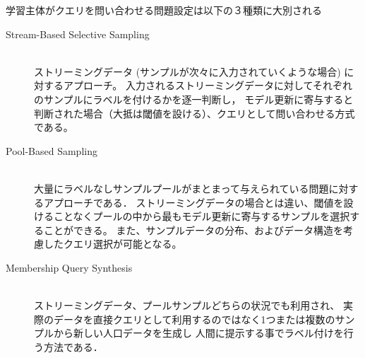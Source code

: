 学習主体がクエリを問い合わせる問題設定は以下の３種類に大別される
\begin{description}
    \item[Stream-Based Selective Sampling]\mbox{}\\
        ストリーミングデータ (サンプルが次々に入力されていくような場合) に対するアプローチ。
        入力されるストリーミングデータに対してそれぞれのサンプルにラベルを付けるかを逐一判断し，
        モデル更新に寄与すると判断された場合（大抵は閾値を設ける）、クエリとして問い合わせる方式である。
    \item[Pool-Based Sampling]\mbox{}\\
        大量にラベルなしサンプルプールがまとまって与えられている問題に対するアプローチである．
        ストリーミングデータの場合とは違い、閾値を設けることなくプールの中から最もモデル更新に寄与するサンプルを選択することができる。
        また、サンプルデータの分布、およびデータ構造を考慮したクエリ選択が可能となる。
    \item[Membership Query Synthesis]\mbox{}\\ 
        ストリーミングデータ、プールサンプルどちらの状況でも利用され、
        実際のデータを直接クエリとして利用するのではなく1つまたは複数のサンプルから新しい人口データを生成し
        人間に提示する事でラベル付けを行う方法である．
\end{description}

